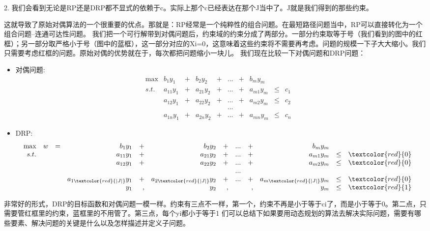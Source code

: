 2. 我们会看到无论是RP还是DRP都不显式的依赖于c。实际上那个c已经表达在那个J当中了。J就是我们得到的那些约束。

这就导致了原始对偶算法的一个很重要的优点。那就是：RP经常是一个纯粹性的组合问题。在最短路径问题当中，RP可以直接转化为一个组合问题--连通可达性问题。
我们把一个可行解带到对偶问题后，约束域的约束分成了两部分。一部分约束取等于号（我们看到的图中的红框）；另一部分取严格小于号（图中的蓝框），这一部分对应的Xi=0，这意味着这些约束将不需要再考虑。问题的规模一下子大大缩小。我们只需要考虑红框的问题。原始对偶的优势就在于，每次都把问题缩小一块儿。
我们现在比较一下对偶问题和DRP问题：
\begin{itemize}
\item 对偶问题:
\[
\begin{array}{rrrrrrrrrrrrl}
\max & b_1y_1    &+&  b_2y_2   &+&  ...&+& b_my_m    &      &    & \\
 s.t. & a_{11}y_1 &+& a_{21}y_2 &+& ... &+& a_{m1}y_m & \leq & c_1 &   \\
      & a_{12}y_1 &+& a_{22}y_2 &+& ... &+& a_{m2}y_m & \leq & c_2 & \\
      &           & &           & & ... & &           &      &     &  \\
      & a_{1n}y_1 &+& a_{2n}y_2 &+& ... &+& a_{mn}y_m & \leq & c_n &
     \end{array} \nonumber
\]
\item DRP:
\[
\begin{array}{rrrrrrrrrrrrrrrrrrrrl}
\max & w &=& b_1y_1    &+&  b_2y_2   &+&  ...&+& b_my_m    &      &    & \\
 s.t. & & & a_{11}y_1 &+& a_{21}y_2 &+& ... &+& a_{m1}y_m & \leq & \textcolor{red}{0} &  \\
      & & & a_{12}y_1 &+& a_{22}y_2 &+& ... &+& a_{m2}y_m & \leq & \textcolor{red}{0} &  \\
      & & &          & &           & & ... & &           &      &     &  \\
      & & & a_{1\textcolor{red}{|J|}}y_1 &+& a_{2\textcolor{red}{|J|}}y_2 &+& ... &+& a_{m\textcolor{red}{|J|}}y_m & \leq & \textcolor{red}{0} & \\
      & & &      y_1 &,&       y_2 &,&     &,&       y_m & \leq & \textcolor{red}{1}   & \\
     \end{array} \nonumber
\]
\end{itemize}
非常好的形式，DRP的目标函数和对偶问题一模一样。约束有三点不一样，第一个，约束不再是小于等于ci了，而是小于等于0。第二点，只需要管红框里的约束，蓝框里的不用管了。第三点，每个yi都小于等于1
们可以总结下如果要用动态规划的算法去解决实际问题，需要有哪些要素、解决问题的关键是什么以及怎样描述并定义子问题。
